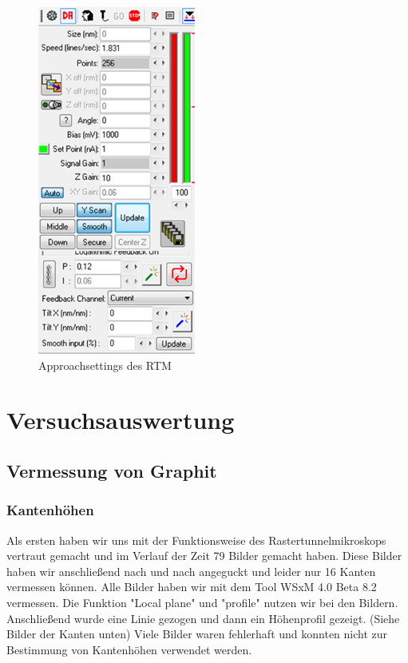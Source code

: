 \documentclass[10pt,a4paper]{article}
\begin{document}
\begin{figure}[h]
	\includegraphics[scale = 0.9]{parameter.png}
	\centering
	\caption{Approachsettings des RTM}
	\label{parameter}
\end{figure}

\section{Versuchsauswertung}

\subsection{Vermessung von Graphit }

\subsubsection{ Kantenhöhen}

Als ersten haben wir uns mit der Funktionsweise des Rastertunnelmikroskops vertraut gemacht und im Verlauf der Zeit 79 Bilder gemacht haben. 
Diese Bilder haben wir anschließend nach und nach angeguckt und leider nur 16 Kanten vermessen können. Alle Bilder haben wir mit dem Tool WSxM 4.0 Beta 8.2 vermessen. 
Die Funktion "Local plane" und "profile" nutzen wir bei den Bildern. Anschließend wurde eine Linie gezogen und dann ein Höhenprofil gezeigt. (Siehe Bilder der Kanten unten)
Viele Bilder waren fehlerhaft und konnten nicht zur Bestimmung von Kantenhöhen verwendet werden.
\end{document}
